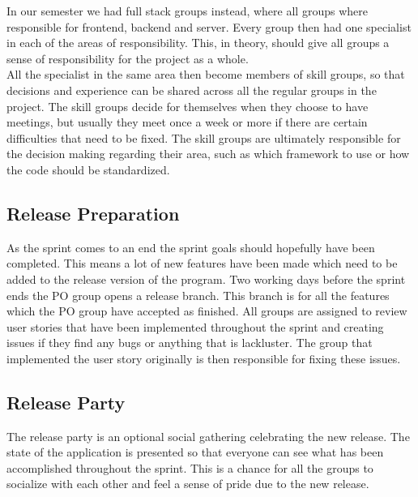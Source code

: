 In our semester we had full stack groups instead, where all groups where responsible for frontend, backend and server. Every group then had one specialist in each of the areas of responsibility.
This, in theory, should give all groups a sense of responsibility for the project as a whole.\\
All the specialist in the same area then become members of skill groups, so that decisions and experience can be shared across all the regular groups in the project.
The skill groups decide for themselves when they choose to have meetings, but usually they meet once a week or more if there are certain difficulties that need to be fixed.
The skill groups are ultimately responsible for the decision making regarding their area, such as which framework to use or how the code should be standardized.

\subsection{Release Preparation}
As the sprint comes to an end the sprint goals should hopefully have been completed.
This means a lot of new features have been made which need to be added to the release version of the program.
Two working days before the sprint ends the PO group opens a release branch.
This branch is for all the features which the PO group have accepted as finished.
All groups are assigned to review user stories that have been implemented throughout the sprint and creating issues if they find any bugs or anything that is lackluster.
The group that implemented the user story originally is then responsible for fixing these issues.

\subsection{Release Party}
The release party is an optional social gathering celebrating the new release. 
The state of the application is presented so that everyone can see what has been accomplished throughout the sprint.
This is a chance for all the groups to socialize with each other and feel a sense of pride due to the new release.


